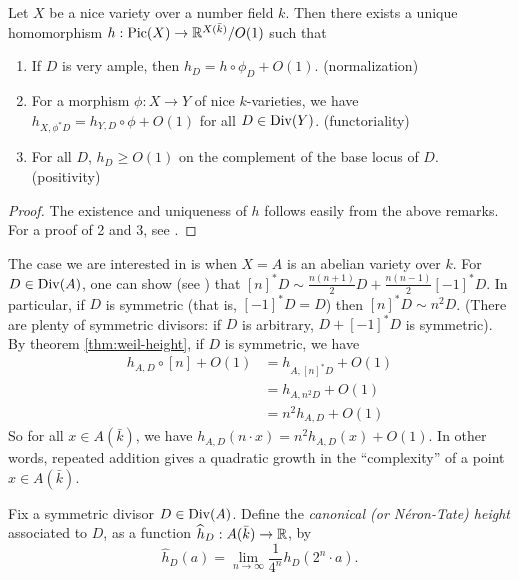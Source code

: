 \documentclass{article}
\begin{document}
\begin{theorem}\label{thm:weil-height}
Let $X$ be a nice variety over a number field $k$. Then there exists a unique 
homomorphism $h:\operatorname{Pic}(X)\to \mathbb{R}^{X(\bar k)}/O(1)$ such that 
\begin{enumerate}
  \item If $D$ is very ample, then $h_D=h\circ \phi_D+O(1)$. (normalization)
  \item For a morphism $\phi:X\to Y$ of nice $k$-varieties, we have 
    $h_{X,\phi^\ast D} = h_{Y,D}\circ\phi + O(1)$ for all $D\in \operatorname{Div}(Y)$. 
    (functoriality)
  \item For all $D$, $h_D\geqslant O(1)$ on the complement of the base locus 
    of $D$. (positivity)
\end{enumerate}
\end{theorem}
\begin{proof}
The existence and uniqueness of $h$ follows easily from the above remarks. For 
a proof of 2 and 3, see \cite[\S2.4]{bg06}. 
\end{proof}

The case we are interested in is when $X=A$ is an abelian variety over $k$. For 
$D\in \operatorname{Div}(A)$, one can show (see \cite[I.5.4]{mi}) that 
$[n]^\ast D\sim \frac{n(n+1)}{2} D + \frac{n(n-1)}{2}[-1]^\ast D$. In 
particular, if $D$ is symmetric (that is, $[-1]^\ast D=D$) then 
$[n]^\ast D\sim n^2 D$. (There are plenty of symmetric divisors: if $D$ is 
arbitrary, $D+[-1]^\ast D$ is symmetric). By theorem \ref{thm:weil-height}, 
if $D$ is symmetric, we have 
\begin{align*}
  h_{A,D}\circ[n]+O(1)
    &= h_{A,[n]^\ast D} + O(1) \\
    &= h_{A,n^2 D}+O(1) \\
    &= n^2 h_{A,D}+O(1)
\end{align*}
So for all $x\in A(\bar k)$, we have 
$h_{A,D}(n\cdot x) = n^2 h_{A,D}(x)+O(1)$. In other words, repeated addition 
gives a quadratic growth in the ``complexity'' of a point $x\in A(\bar k)$. 

Fix a symmetric divisor $D\in \operatorname{Div}(A)$. Define the \emph{canonical (or 
N\'eron-Tate) height} associated to $D$, as a function 
$\widehat h_D:A(\bar k)\to \mathbb{R}$, by 
\[
  \widehat h_D(a) = \lim_{n\to \infty} \frac{1}{4^n} h_D(2^n\cdot a) \text{.}
\]
\end{document}
